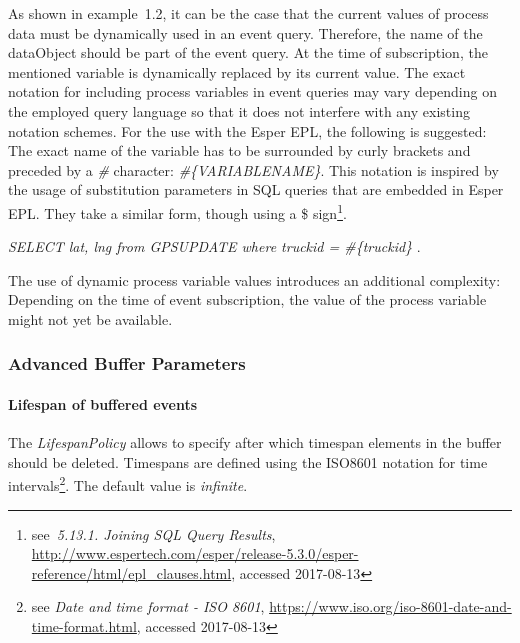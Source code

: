 
As shown in example~1.2, it can be the case that the current values of process data must be dynamically used in an event query. 
Therefore, the name of the dataObject should be part of the event query. At the time of subscription, the mentioned variable is dynamically replaced by its current value.
The exact notation for including process variables in event queries may vary depending on the employed query language so that it does not interfere with any existing notation schemes.
For the use with the Esper EPL, the following is suggested: The exact name of the variable has to be surrounded by curly brackets and preceded by a \textit{\#} character: \textit{\#\{VARIABLENAME\}}.
This notation is inspired by the usage of substitution parameters in SQL queries that are embedded in Esper EPL. They take a similar form, though using a \$ sign\footnote{see~\textit{5.13.1. Joining SQL Query Results}, \url{http://www.espertech.com/esper/release-5.3.0/esper-reference/html/epl_clauses.html}, accessed 2017-08-13}.

\textit{SELECT lat, lng from GPSUPDATE where truckid = \#\{truckid\} }.

The use of dynamic process variable values introduces an additional complexity: Depending on the time of event subscription, the value of the process variable might not yet be available.


\subsubsection{Advanced Buffer Parameters}\label{ch:bpmnx:bufferpolicies}

\paragraph{Lifespan of buffered events\newline}

The \textit{LifespanPolicy} allows to specify after which timespan elements in the buffer should be deleted. Timespans are defined using the ISO8601 notation for time intervals\footnote{see \textit{Date and time format - ISO 8601}, \url{https://www.iso.org/iso-8601-date-and-time-format.html}, accessed 2017-08-13}. 
The default value is \textit{infinite}.

